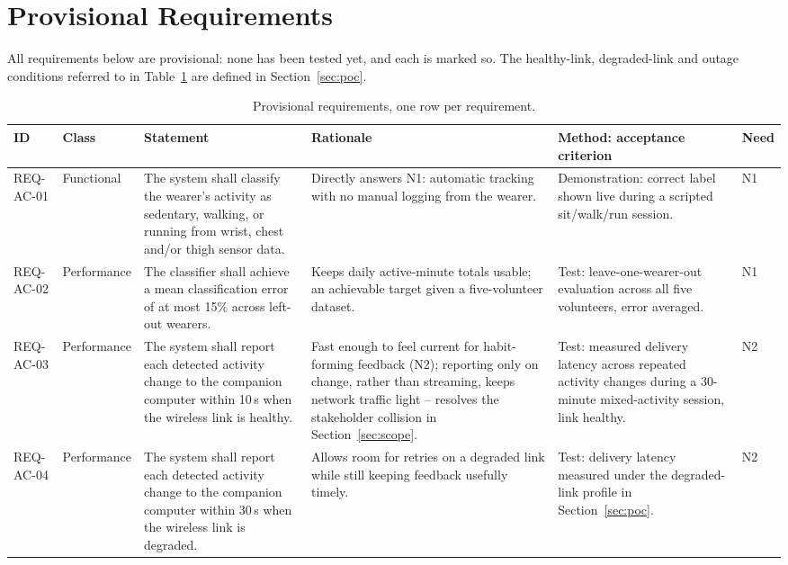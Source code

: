 \section{Provisional Requirements}
\label{sec:reqs}

All requirements below are provisional: none has been tested yet,
and each is marked so. The healthy-link, degraded-link and outage
conditions referred to in Table~\ref{tab:reqs} are defined in
Section~\ref{sec:poc}.

\begin{table}[t]
\centering
\footnotesize
\setlength{\tabcolsep}{3pt}
\caption{Provisional requirements, one row per requirement.}
\label{tab:reqs}
\begin{tabular}{p{1.5cm}p{1.5cm}p{3.9cm}p{3.8cm}p{4.2cm}p{0.7cm}}
\toprule
\textbf{ID} & \textbf{Class} & \textbf{Statement} & \textbf{Rationale} & \textbf{Method: acceptance criterion} & \textbf{Need} \\
\midrule

REQ-AC-01 & Functional &
The system shall classify the wearer's activity as sedentary,
walking, or running from wrist, chest and/or thigh sensor data. &
Directly answers N1: automatic tracking with no manual logging
from the wearer. &
Demonstration: correct label shown live during a scripted
sit/walk/run session. &
N1 \\[0.6em]

REQ-AC-02 & Performance &
The classifier shall achieve a mean classification error of at
most 15\% across left-out wearers. &
Keeps daily active-minute totals usable; an achievable target
given a five-volunteer dataset. &
Test: leave-one-wearer-out evaluation across all five
volunteers, error averaged. &
N1 \\[0.6em]

REQ-AC-03 & Performance &
The system shall report each detected activity change to the
companion computer within 10\,s when the wireless link is
healthy. &
Fast enough to feel current for habit-forming feedback (N2);
reporting only on change, rather than streaming, keeps network
traffic light -- resolves the stakeholder collision in
Section~\ref{sec:scope}. &
Test: measured delivery latency across repeated activity
changes during a 30-minute mixed-activity session, link healthy. &
N2 \\[0.6em]

REQ-AC-04 & Performance &
The system shall report each detected activity change to the
companion computer within 30\,s when the wireless link is
degraded. &
Allows room for retries on a degraded link while still keeping
feedback usefully timely. &
Test: delivery latency measured under the degraded-link profile
in Section~\ref{sec:poc}. &
N2 \\[0.6em]


\end{tabular}
\end{table}

